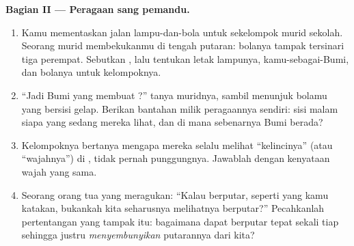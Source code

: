 \begin{problem}
\medskip\noindent\textbf{Bagian II --- Peragaan sang
pemandu.}
\begin{enumerate}[resume]
  \item Kamu mementaskan jalan lampu-dan-bola untuk sekelompok murid
        sekolah. Seorang murid membekukanmu di tengah putaran:
        bolanya tampak tersinari tiga perempat. Sebutkan ,
        lalu tentukan letak lampunya, kamu-sebagai-Bumi, dan bolanya
        untuk kelompoknya.
  \item ``Jadi  Bumi yang membuat ?'' tanya
        muridnya, sambil menunjuk bolamu yang bersisi gelap. Berikan
        bantahan milik peragaannya sendiri: sisi malam siapa yang
        sedang mereka lihat, dan di mana sebenarnya 
        Bumi berada?
  \item Kelompoknya bertanya mengapa mereka selalu melihat
        ``kelincinya'' (atau ``wajahnya'') di , tidak pernah
        punggungnya. Jawablah dengan kenyataan wajah yang sama.
  \item Seorang orang tua yang meragukan: ``Kalau  berputar,
        seperti yang kamu katakan, bukankah kita seharusnya melihatnya
        berputar?'' Pecahkanlah pertentangan yang tampak itu:
        bagaimana  dapat berputar tepat sekali tiap 
        sehingga justru \emph{menyembunyikan} putarannya dari kita?
\end{enumerate}


\end{problem}
